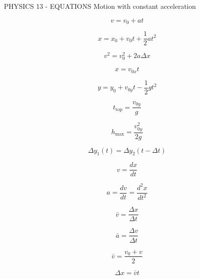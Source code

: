 PHYSICS 13 - EQUATIONS
Motion with constant acceleration

$$v = v_0 + at$$

$$x = x_0 + v_0t + \frac12 at^2$$

$$v^2 = v_0^2 + 2a \Delta x$$

$$x = v_{0x}t$$

$$y = y_0 + v_{0y}t - \frac12 gt^2$$

$$t_{\text{top}} = \frac{v_{0y}}{g}$$

$$h_{\max} = \frac{v_{0y}^2}{2g}$$

$$\Delta y_1(t) = \Delta y_2(t - \Delta t)$$


$$v=\frac{dx}{dt}$$

$$a=\frac{dv}{dt}=\frac{d^2x}{dt^2}$$

$$\bar v=\frac{\Delta x}{\Delta t}$$

$$\bar a=\frac{\Delta v}{\Delta t}$$

$$\bar v=\frac{v_0+v}{2}$$

$$\Delta x=\bar v t$$
